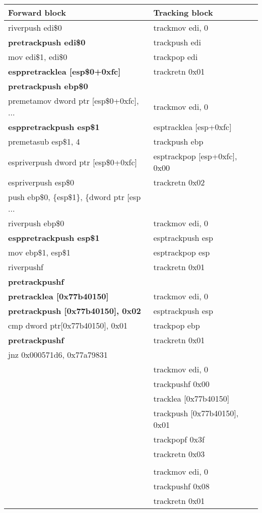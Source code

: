\documentclass[12pt]{report}
\begin{document}
\begin{tabular}{| l | l |}
	\hline
	\textbf{Forward block} & \textbf{Tracking block}\\ \hline
	riverpush edi\$0 & trackmov edi, 0\\
	\textbf{pretrackpush edi\$0} & trackpush edi\\
	mov edi\$1, edi\$0 & trackpop edi\\
	\textbf{esppretracklea [esp\$0+0xfc]} & trackretn 0x01\\
	\textbf{pretrackpush ebp\$0} &\\
	premetamov dword ptr [esp\$0+0xfc], ... & trackmov edi, 0\\
	\textbf{esppretrackpush esp\$1} & esptracklea [esp+0xfc]\\
	premetasub esp\$1, 4 & trackpush ebp\\
	espriverpush dword ptr [esp\$0+0xfc] & esptrackpop [esp+0xfc], 0x00\\
	espriverpush esp\$0 & trackretn 0x02\\
	push ebp\$0, \{esp\$1\}, \{dword ptr [esp ... &\\
	riverpush ebp\$0 & trackmov edi, 0\\
	\textbf{esppretrackpush esp\$1} & esptrackpush esp\\
	mov ebp\$1, esp\$1 & esptrackpop esp\\
	riverpushf & trackretn 0x01\\
	\textbf{pretrackpushf} &\\
	\textbf{pretracklea [0x77b40150]} & trackmov edi, 0\\
	\textbf{pretrackpush [0x77b40150], 0x02} & esptrackpush esp\\
	cmp dword ptr[0x77b40150], 0x01 & trackpop ebp\\
	\textbf{pretrackpushf} & trackretn 0x01\\
	jnz 0x000571d6, 0x77a79831 &\\
	& trackmov edi, 0\\
	& trackpushf 0x00\\
	& tracklea [0x77b40150]\\
	& trackpush [0x77b40150], 0x01\\
	& trackpopf 0x3f\\
	& trackretn 0x03\\
    &\\
	& trackmov edi, 0\\
	& trackpushf 0x08\\
	& trackretn 0x01\\ \hline
\end{tabular}
\end{document}
